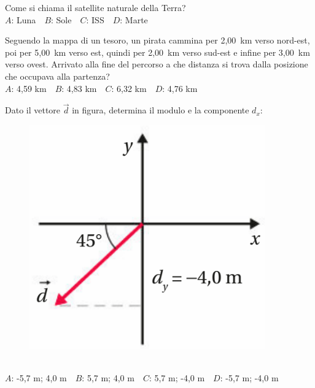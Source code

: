 \mcquestionfooter



\def\mcquestionnumber{8}


\mcquestionheader Come si chiama il satellite naturale della Terra?\\
{$A$}: Luna\ \ {$B$}: Sole\ \ {$C$}: ISS\ \ {$D$}: Marte\ \ 

\mcquestionfooter



\def\mcquestionnumber{9}


\mcquestionheader Seguendo la mappa di un tesoro, un pirata cammina per 2,00~km verso nord-est, poi per 5,00~km verso est, quindi per 2,00~km verso sud-est e infine per 3,00~km verso ovest. Arrivato alla fine del percorso a che distanza si trova dalla posizione che occupava alla partenza?\\
{$A$}: 4,59 km\ \ {$B$}: 4,83 km\ \ {$C$}: 6,32 km\ \ {$D$}: 4,76 km\ \ 

\mcquestionfooter



\def\mcquestionnumber{10}


\mcquestionheader Dato il vettore $\vec{d}$ in figura, determina il modulo e la componente $d_x$: \begin{figure}[h!]   \begin{center}     \includegraphics[scale=0.35]{vettored.png}   \end{center} \end{figure}\\
{$A$}: -5,7 m; 4,0 m\ \ {$B$}: 5,7 m; 4,0 m\ \ {$C$}: 5,7 m; -4,0 m\ \ {$D$}: -5,7 m; -4,0 m\ \ 

